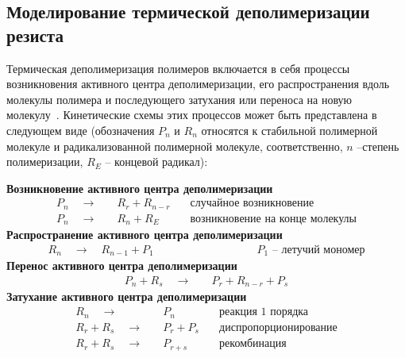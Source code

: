 \subsection{Моделирование термической деполимеризации резиста}
Термическая деполимеризация полимеров включается в себя процессы возникновения активного центра деполимеризации, его распространения вдоль молекулы полимера и последующего затухания или переноса на новую молекулу~\cite{Boyd_1}. Кинетические схемы этих процессов может быть представлена в следующем виде (обозначения $P_n$ и $R_n$ относятся к стабильной полимерной молекуле и радикализованной полимерной молекуле, соответственно, $n$ --степень полимеризации, $R_E$ -- концевой радикал):

\begin{center}
	\textbf{Возникновение активного центра деполимеризации}
	\begin{align*}
		P_n \quad \rightarrow \quad & R_r + R_{n-r} \quad & \text{случайное возникновение} \\
		P_n \quad \rightarrow \quad & R_n + R_E \quad & \text{возникновение на конце молекулы}
	\end{align*}
	\textbf{Распространение активного центра деполимеризации}
	\begin{align*}
		R_n \quad \rightarrow \quad  R_{n-1} + P_1 \qquad\qquad\qquad\qquad\quad\; \text{$P_1$ -- летучий мономер}
	\end{align*}
	\textbf{Перенос активного центра деполимеризации}
	\begin{align*}
		P_n + R_s \quad \rightarrow \quad & P_r + R_{n-r} + P_s
	\end{align*}
	\textbf{Затухание активного центра деполимеризации}
	\begin{align*}
		R_n \quad \rightarrow \quad & P_n \quad & \text{реакция 1 порядка} \\
		R_r + R_s \quad \rightarrow \quad & P_r + P_s \quad & \text{диспропорционирование} \\
		R_r + R_s \quad \rightarrow \quad & P_{r + s} \quad & \text{рекомбинация}
	\end{align*}
\end{center}

